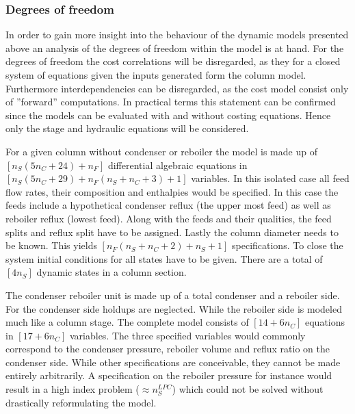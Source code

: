        \subsubsection{Degrees of freedom}
        In order to gain more insight into the behaviour of the dynamic models presented above an analysis
        of the degrees of freedom within the model is at hand. For the degrees of freedom the cost correlations
        will be disregarded, as they for a closed system of equations given the inputs generated form the column
        model. Furthermore interdependencies can be disregarded, as the cost model consist only of ''forward''
        computations. In practical terms this statement can be confirmed since the models can be evaluated
        with and without costing equations. Hence only the stage and hydraulic equations will be considered.

        For a given column without condenser or reboiler the model is made up of $[n_S (5n_C + 24) + n_F]$
        differential algebraic equations in $[n_S (5n_C + 29) + n_F (n_S + n_C + 3) + 1]$ variables. In this
        isolated case all feed flow rates, their composition and enthalpies would be specified. In this case
        the feeds include a hypothetical condenser reflux (the upper most feed) as well as reboiler reflux
        (lowest feed). Along with the feeds and their qualities, the feed splits and reflux split have to be
        assigned. Lastly the column diameter needs to be known. This yields $[n_F (n_S + n_C + 2) + n_S + 1]$
        specifications. To close the system initial conditions for all states have to be given. There
        are a total of $[4 n_S ]$ dynamic states in a column section.

        The condenser reboiler unit is made up of a total condenser and a reboiler side. For the condenser side
        holdups are neglected. While the reboiler side is modeled much like a column stage. The complete model
        consists of $[14 + 6 n_C]$ equations in $[17 + 6 n_C]$ variables. The three specified variables would
        commonly correspond to the condenser pressure, reboiler volume and reflux ratio on the condenser side.
        While other specifications are conceivable, they cannot be made entirely arbitrarily. A specification
        on the reboiler pressure for instance would result in a high index problem ($\approx n_S^{LPC}$) which
        could not be solved without drastically reformulating the model.


